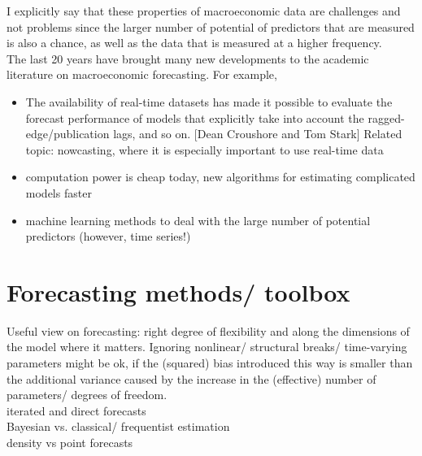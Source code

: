 \documentclass[12pt,a4paper]{scrartcl}
\begin{document}
I explicitly say that these properties of macroeconomic data are challenges and not problems since the larger number of potential of predictors that are measured is also a chance, as well as the data that is measured at a higher frequency.\\

The last 20 years have brought many new developments to the academic literature on macroeconomic forecasting. For example,

\begin{itemize}
	\item The availability of real-time datasets has made it possible to evaluate the forecast performance of models that explicitly take into account the ragged-edge/publication lags, and so on. [Dean Croushore and Tom Stark] Related topic: nowcasting, where it is especially important to use real-time data
	\item computation power is cheap today, new algorithms for estimating complicated models faster
	\item machine learning methods to deal with the large number of potential predictors (however, time series!)
\end{itemize}

\section{Forecasting methods/ toolbox}

Useful view on forecasting: right degree of flexibility and along the dimensions of the model where it matters. Ignoring nonlinear/ structural breaks/ time-varying parameters might be ok, if the (squared) bias introduced this way is smaller than the additional variance caused by the increase in the (effective) number of parameters/ degrees of freedom.\\

iterated and direct forecasts\\

Bayesian vs. classical/ frequentist estimation\\

density vs point forecasts\\
\end{document}
